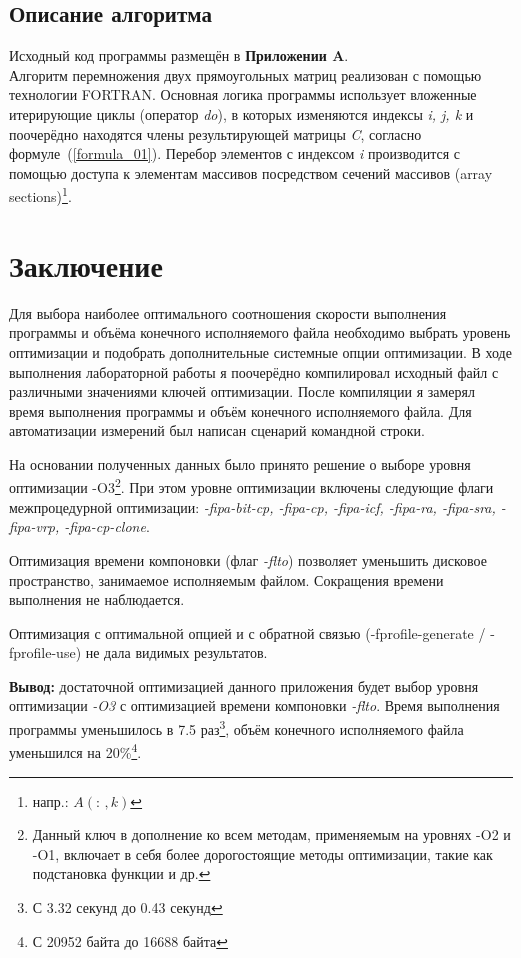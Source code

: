 \documentclass[a4paper, 12pt] {article}
\begin{document}
\subsection{Описание алгоритма}
  Исходный код программы размещён в \textbf{Приложении A}.\\
  Алгоритм перемножения двух прямоугольных матриц реализован с помощью
технологии FORTRAN. Основная логика программы использует вложенные
итерирующие циклы (оператор \textit{do}), в которых изменяются
индексы \textit{i, j, k} и поочерёдно находятся члены результирующей
матрицы \textit{C}, согласно формуле~(\ref{formula_01}).
Перебор элементов с индексом \textit{i} производится с помощью
доступа к элементам массивов посредством сечений массивов (array
sections)\footnote{напр.: $A(:\,, k)$}.


\newpage
\section{Заключение}
  Для выбора наиболее оптимального соотношения скорости выполнения
программы и объёма конечного исполняемого файла необходимо выбрать
уровень оптимизации и подобрать дополнительные системные опции
оптимизации. В ходе выполнения лабораторной работы я поочерёдно
компилировал исходный файл с различными значениями ключей
оптимизации. После компиляции я замерял время выполнения программы и
объём конечного исполняемого файла. Для автоматизации измерений был
написан сценарий командной строки. 
  
 На основании полученных данных было принято решение о выборе уровня
оптимизации -O3\footnote{Данный ключ в дополнение ко всем методам, применяемым на
уровнях -O2 и -O1, включает в себя более дорогостоящие методы оптимизации, такие как
подстановка функции и др.}.
При этом уровне оптимизации включены следующие флаги межпроцедурной оптимизации: \textit{-fipa-bit-cp, -fipa-cp, -fipa-icf, -fipa-ra, -fipa-sra, -fipa-vrp, -fipa-cp-clone}\cite{gcc}.

  Оптимизация времени компоновки (флаг \textit{-flto}) позволяет уменьшить дисковое пространство, занимаемое исполняемым файлом. Сокращения времени выполнения не наблюдается.

  Оптимизация с оптимальной опцией и с обратной связью
  (-fprofile-generate / -fprofile-use) не дала видимых результатов.\medskip

  \textbf{Вывод:} достаточной оптимизацией данного приложения будет
выбор уровня оптимизации \textit{-O3} с оптимизацией времени компоновки \textit{-flto}.
Время выполнения программы уменьшилось в 7.5 раз\footnote{С 3.32
секунд до 0.43 секунд}, объём конечного исполняемого файла уменьшился на 20\%\footnote{С 20952 байта до 16688 байта}.
  
\end{document}
